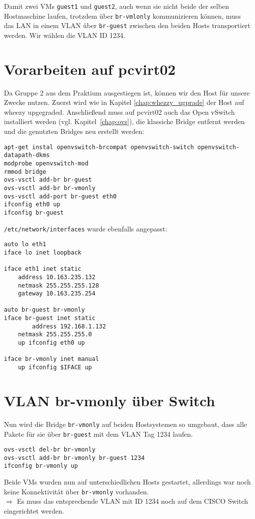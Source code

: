 Damit zwei VMs \verb#guest1# und \verb#guest2#, auch wenn sie nicht beide der selben Hostmaschine laufen, trotzdem über \verb#br-vmlonly# kommunizieren können, muss das LAN in einem VLAN über \verb#br-guest# zwischen den beiden Hosts transportiert werden. Wir wählen die VLAN ID 1234.

\section {Vorarbeiten auf pcvirt02}
Da Gruppe 2 aus dem Praktium ausgestiegen ist, können wir den Host für unsere Zwecke nutzen. Zuerst wird wie in Kapitel \ref{chap:whezzy_ugprade} der Host auf wheezy upgegraded.
Anschließend muss auf pcvirt02 auch das Open vSwitch installiert werden (vgl. Kapitel~\ref{chap:ovs}), die klassiche Bridge entfernt werden und die genutzten Bridges neu erstellt werden:
\begin{verbatim}
apt-get instal openvswitch-brcompat openvswitch-switch openvswitch-datapath-dkms
modprobe openvswitch-mod
rmmod bridge
ovs-vsctl add-br br-guest
ovs-vsctl add-br br-vmonly
ovs-vsctl add-port br-guest eth0
ifconfig eth0 up
ifconfig br-guest
\end{verbatim}

\verb#/etc/network/interfaces# wurde ebenfalls angepasst:
\setupVerbatimOut
\begin{verbatim}
auto lo eth1
iface lo inet loopback

iface eth1 inet static
    address 10.163.235.132
	netmask 255.255.255.128
	gateway 10.163.235.254

auto br-guest br-vmonly
iface br-guest inet static
        address 192.168.1.132
	netmask 255.255.255.0
	up ifconfig eth0 up

iface br-vmonly inet manual 
	up ifconfig $IFACE up 
\end{verbatim}

\section{VLAN br-vmonly über Switch}
Nun wird die Bridge \verb#br-vmonly# auf beiden Hostsystemen so umgebaut, dass alle Pakete für sie über \verb#br-guest# mit dem VLAN Tag 1234 laufen.

\setupVerbatimOut
\begin{verbatim}
ovs-vsctl del-br br-vmonly
ovs-vsctl add-br br-vmonly br-guest 1234
ifconfig br-vmonly up
\end{verbatim}
Beide VMs wurden nun auf unterschiedlichen Hosts gestartet, allerdings war noch keine Kon\-nek\-tiv\-ität über \verb#br-vmonly# vorhanden.
\\
$\Rightarrow$ Es muss das entsprechende VLAN mit ID 1234 noch auf dem CISCO Switch eingerichtet werden.

